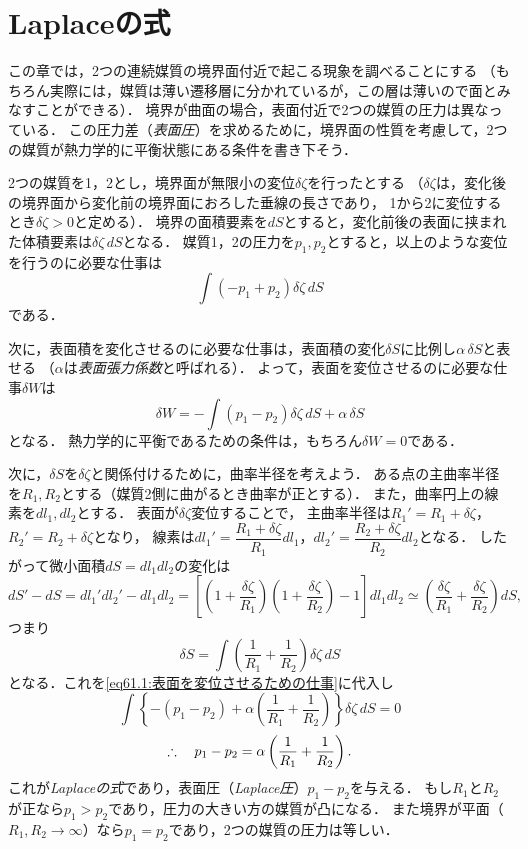 \section{Laplaceの式}

この章では，2つの連続媒質の境界面付近で起こる現象を調べることにする
（もちろん実際には，媒質は薄い遷移層に分かれているが，この層は薄いので面とみなすことができる）．
境界が曲面の場合，表面付近で2つの媒質の圧力は異なっている．
この圧力差（\emph{表面圧}）を求めるために，境界面の性質を考慮して，2つの媒質が熱力学的に平衡状態にある条件を書き下そう．



2つの媒質を1，2とし，境界面が無限小の変位$\delta\zeta$を行ったとする
（$\delta\zeta$は，変化後の境界面から変化前の境界面におろした垂線の長さであり，
1から2に変位するとき$\delta\zeta>0$と定める）．
境界の面積要素を$dS$とすると，変化前後の表面に挟まれた体積要素は$\delta\zeta \, dS$となる．
媒質1，2の圧力を$p_1, p_2$とすると，以上のような変位を行うのに必要な仕事は
\[
    \int (-p_1 + p_2) \delta\zeta \, dS
\]
である．

次に，表面積を変化させるのに必要な仕事は，表面積の変化$\delta S$に比例し$\alpha \, \delta S$と表せる
（$\alpha$は\emph{表面張力係数}と呼ばれる）．
よって，表面を変位させるのに必要な仕事$\delta W$は
\begin{equation}\label{eq61.1:表面を変位させるための仕事}
    \delta W = -\int (p_1 - p_2) \delta\zeta \, dS + \alpha \, \delta S
\end{equation}
となる．
熱力学的に平衡であるための条件は，もちろん$\delta W = 0$である．




次に，$\delta S$を$\delta\zeta$と関係付けるために，曲率半径を考えよう．
ある点の主曲率半径を$R_1, R_2$とする（媒質2側に曲がるとき曲率が正とする）．
また，曲率円上の線素を$dl_1, dl_2$とする．
表面が$\delta\zeta$変位することで，
主曲率半径は$R_1'=R_1+\delta\zeta$，$R_2'=R_2+\delta\zeta$となり，
線素は$dl_1' = \dfrac{R_1+\delta\zeta}{R_1} dl_1$，$dl_2' = \dfrac{R_2+\delta\zeta}{R_2} dl_2$となる．
したがって微小面積$dS=dl_1dl_2$の変化は
\[
    dS' - dS = dl_1'dl_2' - dl_1dl_2
    = \left[ \left( 1 + \frac{\delta\zeta}{R_1} \right) \left( 1 + \frac{\delta\zeta}{R_2} \right) -1 \right] dl_1dl_2
    \simeq \left( \frac{\delta\zeta}{R_1} + \frac{\delta\zeta}{R_2} \right) dS ,
\]
つまり
\begin{equation}\label{eq61.2:面積の変分と曲率}
    \delta S = \int \left( \frac{1}{R_1} + \frac{1}{R_2} \right) \delta\zeta \, dS
\end{equation}
となる．これを\eqref{eq61.1:表面を変位させるための仕事}に代入し
\[
    \int \left\{ -(p_1 - p_2) + \alpha \left( \frac{1}{R_1} + \frac{1}{R_2} \right) \right\} \delta\zeta \, dS = 0
\]
\begin{equation}\label{eq61.3:Laplaceの式}
    \therefore\quad p_1 - p_2 = \alpha \left( \frac{1}{R_1} + \frac{1}{R_2} \right) .
\end{equation}
これが\emph{Laplaceの式}であり，表面圧（\emph{Laplace圧}）$p_1-p_2$を与える．
もし$R_1$と$R_2$が正なら$p_1>p_2$であり，圧力の大きい方の媒質が凸になる．
また境界が平面（$R_1, R_2 \to \infty$）なら$p_1=p_2$であり，2つの媒質の圧力は等しい．




